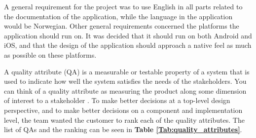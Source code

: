 A general requirement for the project was to use English in all parts related to the documentation of the application, while the language in the application would be Norwegian. Other general requirements concerned the platforms the application should run on. It was decided that it should run on both Android and iOS, and that the design of the application should approach a native feel as much as possible on these platforms.\newline

A quality attribute (QA) is a measurable or testable property of a system that is used to indicate how well the system satisfies the needs of the stakeholders. You can think of a quality attribute as measuring the product along some dimension of interest to a stakeholder \cite[p.63]{Bass:2012:SAP:2392670}. To make better decisions at a top-level design perspective, and to make better decisions on a component and implementation level, the team wanted the customer to rank each of the quality attributes. The list of QAs and the ranking can be seen in \textbf{Table \ref{Tab:quality_attributes}}. \newline

